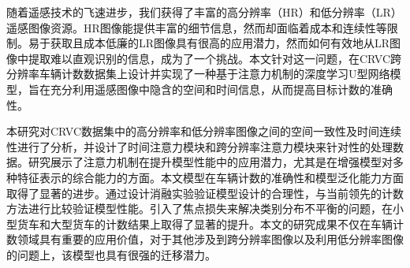 
随着遥感技术的飞速进步，我们获得了丰富的高分辨率（HR）和低分辨率（LR）遥感图像资源。HR图像能提供丰富的细节信息，然而却面临着成本和连续性等限制。易于获取且成本低廉的LR图像具有很高的应用潜力，然而如何有效地从LR图像中提取难以直观识别的信息，成为了一个挑战。本文针对这一问题，在CRVC跨分辨率车辆计数数据集上设计并实现了一种基于注意力机制的深度学习U型网络模型，旨在充分利用遥感图像中隐含的空间和时间信息，从而提高目标计数的准确性。

本研究对CRVC数据集中的高分辨率和低分辨率图像之间的空间一致性及时间连续性进行了分析，并设计了时间注意力模块和跨分辨率注意力模块来针对性的处理数据。研究展示了注意力机制在提升模型性能中的应用潜力，尤其是在增强模型对多种特征表示的综合能力的方面。本文模型在车辆计数的准确性和模型泛化能力方面取得了显著的进步。通过设计消融实验验证模型设计的合理性，与当前领先的计数方法进行比较验证模型性能。引入了焦点损失来解决类别分布不平衡的问题，在小型货车和大型货车的计数结果上取得了显著的提升。本文的研究成果不仅在车辆计数领域具有重要的应用价值，对于其他涉及到跨分辨率图像以及利用低分辨率图像的问题上，该模型也具有很强的迁移潜力。

